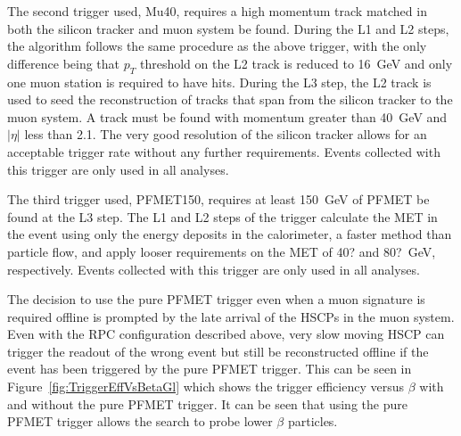 The second trigger used, Mu40, requires a high momentum track matched in both the silicon tracker and muon system be found.
During the L1 and L2 steps, the algorithm follows the same procedure as the above trigger, with the only difference being that $p_T$ threshold on the L2 track
is reduced to 16~GeV and only one muon station is required to have hits.
During the L3 step, the L2 track is used to seed the reconstruction of tracks that span from the silicon tracker to the muon system.
A track must be found with momentum greater than 40~GeV and $|\eta|$ less than 2.1. The very good resolution of the silicon tracker allows for an acceptable trigger rate
without any further requirements. Events collected with this trigger are only used in all analyses.

The third trigger used, PFMET150, requires at least 150~GeV of PFMET be found at the L3 step. The L1 and L2 steps of the trigger calculate the MET in the event using
only the energy deposits in the calorimeter, a faster method than particle flow, and apply looser requirements on the MET of 40? and 80?~GeV, respectively.
Events collected with this trigger are only used in all analyses.

The decision to use the pure PFMET trigger even when a muon signature is required offline is prompted by the late arrival of the HSCPs in the muon system.
Even with the RPC configuration described above, very slow moving HSCP can trigger the readout of the wrong event but still be reconstructed offline
if the event has been triggered by the pure PFMET trigger. This can be seen in Figure~\ref{fig:TriggerEffVsBetaGl} which shows the trigger efficiency versus $\beta$
with and without the pure PFMET trigger.
It can be seen that using the pure PFMET trigger allows the search to probe lower $\beta$ particles. 



